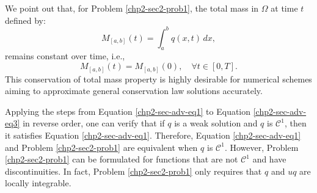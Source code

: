 We point out that, for Problem \ref{chp2-sec2-prob1}, the total mass in $\Omega$ at time $t$ defined by:
\begin{equation*}
{M}_{[a,b]}(t) = \int_{a}^{b} q(x,t) \,dx,
\end{equation*}
remains constant over time, i.e.,
\begin{equation*}
	{M}_{[a,b]}(t) = {M}_{[a,b]}(0), \quad \forall t \in [0,T].
\end{equation*}
This conservation of total mass property is highly desirable for numerical schemes aiming
to approximate general conservation law solutions accurately.

Applying the steps from Equation \eqref{chp2-sec-adv-eq1} to Equation \eqref{chp2-sec-adv-eq3} in reverse order,
one can verify that if ${q}$ is a weak solution and $q$ is $\mathcal{C}^1$, then it satisfies Equation \eqref{chp2-sec-adv-eq1}.
Therefore, Equation \eqref{chp2-sec-adv-eq1} and Problem \eqref{chp2-sec2-prob1} are equivalent when ${q}$ is $\mathcal{C}^1$.
However, Problem \eqref{chp2-sec2-prob1} can be formulated for functions that are not $\mathcal{C}^1$ and have discontinuities.
In fact, Problem \eqref{chp2-sec2-prob1} only requires that $q$ and $uq$ are locally integrable.

